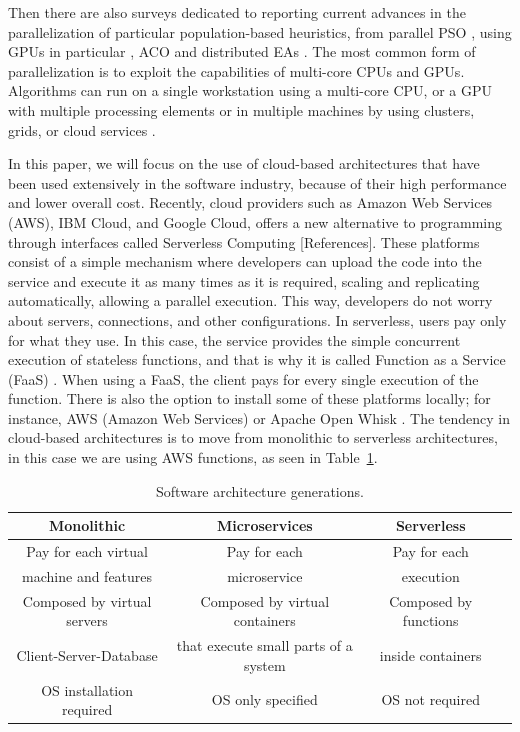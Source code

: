\documentclass[runningheads]{llncs}
\begin{document}
Then there are also surveys dedicated to reporting current advances in the
parallelization of particular population-based heuristics, from parallel PSO
\cite{Lalwani2019}, using GPUs in particular \cite{tan2015survey}, ACO
\cite{pedemonte2011survey} and distributed EAs \cite{gong2015distributed}.  
The most common form of parallelization is to exploit the capabilities of
multi-core CPUs and GPUs. Algorithms can run on a single workstation using a
multi-core CPU, or a GPU with multiple processing elements or in multiple
machines by using clusters, grids, or cloud services \cite{Lalwani2019}.

In this paper, we will focus on the use of cloud-based architectures that have
been used extensively in the software industry, because of their high
performance and lower overall cost. Recently, cloud providers such as Amazon Web
Services (AWS), IBM Cloud, and Google Cloud, offers a new alternative to
programming through interfaces called Serverless Computing [References]. These
platforms consist of a simple mechanism where developers can upload the code
into the service and execute it as many times as it is required, scaling and
replicating automatically, allowing a parallel execution. This way, developers
do not worry about servers, connections, and other configurations. In
serverless, users pay only for what they use. In this case, the service provides
the simple concurrent execution of stateless functions, and that is why it is
called Function as a Service (FaaS) \cite{Hellerstein2018,Everywhere,Baird2016}
. When using a FaaS, the client pays for every single execution of the function.
There is also the option to install some of these platforms locally; for
instance, AWS (Amazon Web Services) \cite{Baird2016} or Apache Open Whisk
\cite{Guerv2018}. The tendency in cloud-based architectures is to move from 
monolithic to serverless architectures, in this case we are using AWS functions, as seen in Table~\ref{table:architectures}.     

\begin{table}[htp]
  \caption{Software architecture generations.}
  \label{table:architectures}
  \centering
  \begin{tabular}{|c|c|c|c|}
  \hline
  Monolithic & Microservices & Serverless \\
  \hline
  Pay for each virtual  & Pay for each  & Pay for each \\
  machine and features  & microservice  & execution \\
  \hline
  Composed by virtual servers  & Composed by virtual containers & Composed by functions \\
  Client-Server-Database & that execute small parts of a system & inside containers \\
  \hline
  OS installation required & OS only specified & OS not required\\
  \hline
  \end{tabular}
  \end{table}
\end{document}
